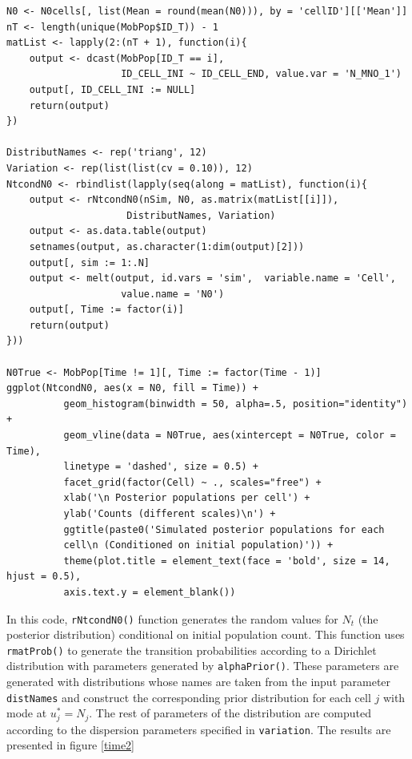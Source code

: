 \documentclass[12pt, a4paper]{article}
\begin{document}
\begin{verbatim}
N0 <- N0cells[, list(Mean = round(mean(N0))), by = 'cellID'][['Mean']]
nT <- length(unique(MobPop$ID_T)) - 1
matList <- lapply(2:(nT + 1), function(i){
    output <- dcast(MobPop[ID_T == i], 
                    ID_CELL_INI ~ ID_CELL_END, value.var = 'N_MNO_1')
    output[, ID_CELL_INI := NULL]
    return(output)
})

DistributNames <- rep('triang', 12)
Variation <- rep(list(list(cv = 0.10)), 12)
NtcondN0 <- rbindlist(lapply(seq(along = matList), function(i){
    output <- rNtcondN0(nSim, N0, as.matrix(matList[[i]]),  
                     DistributNames, Variation)
    output <- as.data.table(output)
    setnames(output, as.character(1:dim(output)[2]))
    output[, sim := 1:.N]
    output <- melt(output, id.vars = 'sim',  variable.name = 'Cell', 
                    value.name = 'N0')
    output[, Time := factor(i)]
    return(output)
}))

N0True <- MobPop[Time != 1][, Time := factor(Time - 1)]
ggplot(NtcondN0, aes(x = N0, fill = Time)) + 
          geom_histogram(binwidth = 50, alpha=.5, position="identity") + 
          geom_vline(data = N0True, aes(xintercept = N0True, color = Time), 
          linetype = 'dashed', size = 0.5) + 
          facet_grid(factor(Cell) ~ ., scales="free") +
          xlab('\n Posterior populations per cell') + 
          ylab('Counts (different scales)\n') +
          ggtitle(paste0('Simulated posterior populations for each 
          cell\n (Conditioned on initial population)')) +
          theme(plot.title = element_text(face = 'bold', size = 14, hjust = 0.5), 
          axis.text.y = element_blank())  
\end{verbatim}

In this code, \texttt{rNtcondN0()} function generates the random values for $N_{t}$ (the posterior 
distribution) conditional on initial population count. This function uses \texttt{rmatProb()}  to generate 
the transition probabilities according to a Dirichlet distribution with parameters generated by \texttt{alphaPrior()}. 
These parameters are generated with distributions whose names are taken from the input 
parameter \texttt{distNames} and construct the corresponding prior distribution for each cell $j$ with 
mode at $u_{j}^{*}=N_{j}$. The rest of parameters of the distribution are computed according to the 
dispersion parameters specified in \texttt{variation}. The results are presented in figure \ref{time2}
\end{document}
